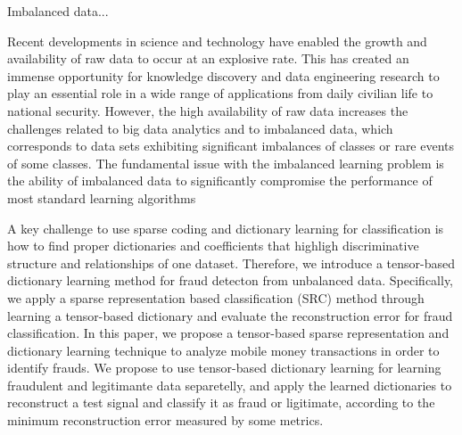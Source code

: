Imbalanced data...

Recent developments in science and technology have enabled the growth and availability of raw data to occur at an explosive rate. This has created an immense opportunity for knowledge discovery and data engineering research to play an essential role in a wide range of applications from daily civilian life to national security. However, the high availability of raw data increases the challenges related to big data analytics and to imbalanced data, which corresponds to data sets exhibiting significant imbalances of classes or rare events of some classes. The fundamental issue with the imbalanced learning problem is the ability of imbalanced data to significantly compromise the performance of most standard learning algorithms

A key challenge to use sparse coding and dictionary learning for classification is how to find proper dictionaries and coefficients that highligh discriminative structure and relationships of one dataset. Therefore, we introduce a tensor-based dictionary learning method for fraud detecton from unbalanced data. Specifically, we apply a sparse representation based classification (SRC) method through learning a tensor-based dictionary and evaluate the reconstruction error for fraud classification. In this paper, we propose a tensor-based sparse representation and dictionary learning technique to analyze mobile money transactions in order to identify frauds. We propose to use tensor-based dictionary learning for learning fraudulent and legitimante data separetelly, and apply the learned dictionaries to reconstruct a test signal and classify it as fraud or ligitimate, according to the minimum reconstruction error measured by some metrics.


